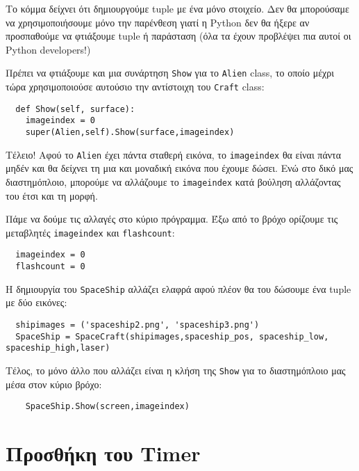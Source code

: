 Το κόμμα δείχνει ότι δημιουργούμε tuple με ένα μόνο στοιχείο. Δεν θα
   μπορούσαμε να χρησιμοποιήσουμε μόνο την παρένθεση γιατί η Python δεν θα
   ήξερε αν προσπαθούμε να φτιάξουμε tuple ή παράσταση (όλα τα έχουν
   προβλέψει πια αυτοί οι Python developers!)

Πρέπει να φτιάξουμε και μια συνάρτηση {\tt Show} για το {\tt Alien} class, το οποίο μέχρι τώρα χρησιμοποιούσε αυτούσιο την αντίστοιχη του {\tt Craft} class:

\begin{verbatim}
  def Show(self, surface):
    imageindex = 0
    super(Alien,self).Show(surface,imageindex)
\end{verbatim}

Τέλειο! Αφού το {\tt Alien} έχει πάντα σταθερή εικόνα, το {\tt imageindex} θα είναι πάντα μηδέν και θα δείχνει τη μια και μοναδική εικόνα που έχουμε δώσει. Ενώ
   στο δικό μας διαστημόπλοιο, μπορούμε να αλλάζουμε το {\tt imageindex} κατά
   βούληση αλλάζοντας του έτσι και τη μορφή.

Πάμε να δούμε τις αλλαγές στο κύριο πρόγραμμα. Έξω από το βρόχο ορίζουμε τις μεταβλητές {\tt imageindex} και {\tt flashcount}:

\begin{verbatim}
  imageindex = 0
  flashcount = 0
\end{verbatim}

Η δημιουργία του {\tt SpaceShip} αλλάζει ελαφρά αφού πλέον θα του δώσουμε ένα
   tuple με δύο εικόνες:

\begin{verbatim}
  shipimages = ('spaceship2.png', 'spaceship3.png')
  SpaceShip = SpaceCraft(shipimages,spaceship_pos, spaceship_low, spaceship_high,laser)
\end{verbatim}

Τέλος, το μόνο άλλο που αλλάζει είναι η κλήση της {\tt Show} για το διαστημόπλοιο μας μέσα στον κύριο βρόχο:

\begin{verbatim}
    SpaceShip.Show(screen,imageindex)
\end{verbatim}

\section{Προσθήκη του Timer}

